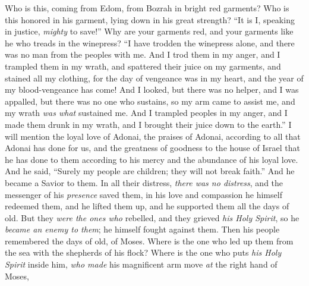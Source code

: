 \begin{biblechapter} %
 Who is this, coming from Edom, 
from Bozrah in bright red garments? 
Who is this honored in his garment, 
lying down in his great strength? 
“It is I, speaking in justice, 
\textit{mighty} to save!”
\verse Why are your garments red, 
and your garments like he who treads in the winepress?
\verse “I have trodden the winepress alone, 
and there was no man from the peoples with me. 
And I trod them in my anger, 
and I trampled them in my wrath, 
and spattered their juice on my garments, 
and stained all my clothing,
\verse for the day of vengeance was in my heart, 
and the year of my blood-vengeance has come!
\verse And I looked, but there was no helper, 
and I was appalled, but there was no one who sustains, 
so my arm came to assist me, 
and my wrath \textit{was what} sustained me.
\verse And I trampled peoples in my anger, 
and I made them drunk in my wrath, 
and I brought their juice down to the earth.”
 I will mention the loyal love of Adonai, the praises of Adonai, according to all that Adonai has done for us, 
and the greatness of goodness to the house of Israel that he has done to them according to his mercy and the abundance of his loyal love.
\verse And he said, “Surely my people are children; they will not break faith.” And he became a Savior to them.
\verse In all their distress, \textit{there was no distress}, 
and the messenger of his \textit{presence} saved them, 
in his love and compassion he himself redeemed them, 
and he lifted them up, 
and he supported them all the days of old.
\verse But they \textit{were the ones who} rebelled, 
and they grieved \textit{his Holy Spirit}, 
so he \textit{became an enemy to them}; 
he himself fought against them.
\verse Then his people remembered the days of old, of Moses. 
Where is the one who led up them from the sea with the shepherds of his flock? 
Where is the one who puts \textit{his Holy Spirit} inside him,
\verse \textit{who made} his magnificent arm move \textit{at} the right hand of Moses, 

\end{biblechapter}
